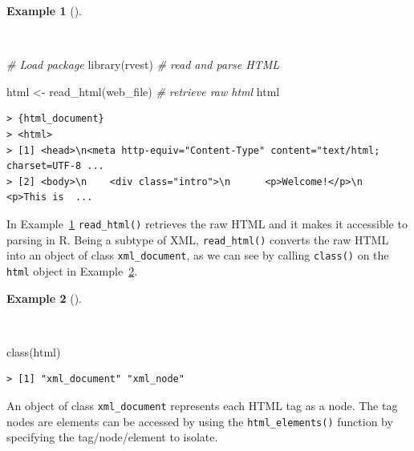 \documentclass[
  letterpaper,
  DIV=11,
  numbers=noendperiod]{scrreport}
\newenvironment{Shaded}{\begin{snugshade}}{\end{snugshade}}
\newcommand{\CommentTok}[1]{\textcolor[rgb]{0.00,0.00,0.00}{\textit{#1}}}
\newcommand{\FunctionTok}[1]{\textcolor[rgb]{0.00,0.00,0.00}{#1}}
\newcommand{\NormalTok}[1]{\textcolor[rgb]{0.00,0.00,0.00}{#1}}
\newcommand{\OtherTok}[1]{\textcolor[rgb]{0.00,0.00,0.00}{#1}}
\theoremstyle{definition}
\newtheorem{example}{Example}[chapter]
\theoremstyle{remark}
\begin{document}
\begin{example}[]\protect\hypertarget{exm-ad-read-html-toy}{}\label{exm-ad-read-html-toy}

~

\begin{Shaded}
\begin{Highlighting}[]
\CommentTok{\# Load package}
\FunctionTok{library}\NormalTok{(rvest) }\CommentTok{\# read and parse HTML}

\NormalTok{html }\OtherTok{\textless{}{-}} \FunctionTok{read\_html}\NormalTok{(web\_file) }\CommentTok{\# retrieve raw html}
\NormalTok{html}
\end{Highlighting}
\end{Shaded}

\begin{verbatim}
> {html_document}
> <html>
> [1] <head>\n<meta http-equiv="Content-Type" content="text/html; charset=UTF-8 ...
> [2] <body>\n    <div class="intro">\n      <p>Welcome!</p>\n      <p>This is  ...
\end{verbatim}

\end{example}

In Example~\ref{exm-ad-read-html-toy} \texttt{read\_html()} retrieves
the raw HTML and it makes it accessible to parsing in R. Being a subtype
of XML, \texttt{read\_html()} converts the raw HTML into an object of
class \texttt{xml\_document}, as we can see by calling \texttt{class()}
on the \texttt{html} object in
Example~\ref{exm-ad-class-html-toy-class}.

\begin{example}[]\protect\hypertarget{exm-ad-class-html-toy-class}{}\label{exm-ad-class-html-toy-class}

~

\begin{Shaded}
\begin{Highlighting}[]
\FunctionTok{class}\NormalTok{(html)}
\end{Highlighting}
\end{Shaded}

\begin{verbatim}
> [1] "xml_document" "xml_node"
\end{verbatim}

\end{example}

An object of class \texttt{xml\_document} represents each HTML tag as a
node. The tag nodes are elements can be accessed by using the
\texttt{html\_elements()} function by specifying the tag/node/element to
isolate.
\end{document}
